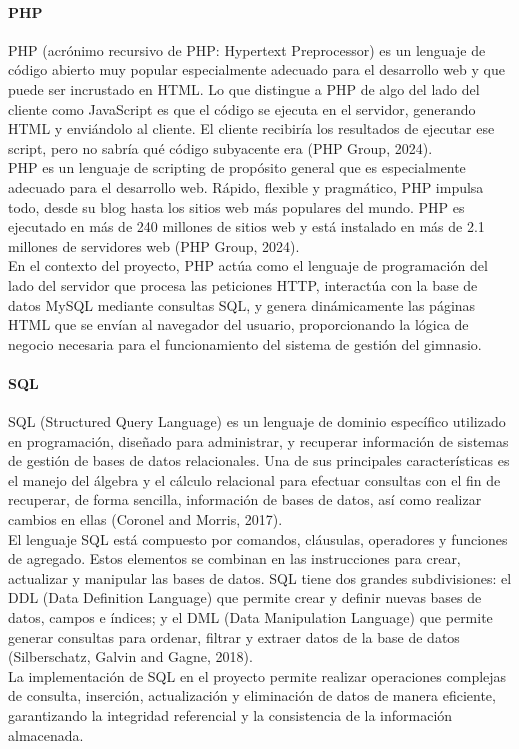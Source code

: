 \documentclass[12pt, letterpaper]{article}
\begin{document}
\paragraph{\textbf{PHP}}
PHP (acrónimo recursivo de PHP: Hypertext Preprocessor) es un lenguaje de código abierto muy popular especialmente adecuado para el desarrollo web y que puede ser incrustado en HTML. Lo que distingue a PHP de algo del lado del cliente como JavaScript es que el código se ejecuta en el servidor, generando HTML y enviándolo al cliente. El cliente recibiría los resultados de ejecutar ese script, pero no sabría qué código subyacente era (PHP Group, 2024).\\
PHP es un lenguaje de scripting de propósito general que es especialmente adecuado para el desarrollo web. Rápido, flexible y pragmático, PHP impulsa todo, desde su blog hasta los sitios web más populares del mundo. PHP es ejecutado en más de 240 millones de sitios web y está instalado en más de 2.1 millones de servidores web (PHP Group, 2024).\\
En el contexto del proyecto, PHP actúa como el lenguaje de programación del lado del servidor que procesa las peticiones HTTP, interactúa con la base de datos MySQL mediante consultas SQL, y genera dinámicamente las páginas HTML que se envían al navegador del usuario, proporcionando la lógica de negocio necesaria para el funcionamiento del sistema de gestión del gimnasio.\\
\paragraph{\textbf{SQL}}
SQL (Structured Query Language) es un lenguaje de dominio específico utilizado en programación, diseñado para administrar, y recuperar información de sistemas de gestión de bases de datos relacionales. Una de sus principales características es el manejo del álgebra y el cálculo relacional para efectuar consultas con el fin de recuperar, de forma sencilla, información de bases de datos, así como realizar cambios en ellas (Coronel and Morris, 2017).\\
El lenguaje SQL está compuesto por comandos, cláusulas, operadores y funciones de agregado. Estos elementos se combinan en las instrucciones para crear, actualizar y manipular las bases de datos. SQL tiene dos grandes subdivisiones: el DDL (Data Definition Language) que permite crear y definir nuevas bases de datos, campos e índices; y el DML (Data Manipulation Language) que permite generar consultas para ordenar, filtrar y extraer datos de la base de datos (Silberschatz, Galvin and Gagne, 2018).\\
La implementación de SQL en el proyecto permite realizar operaciones complejas de consulta, inserción, actualización y eliminación de datos de manera eficiente, garantizando la integridad referencial y la consistencia de la información almacenada.\\
\end{document}
